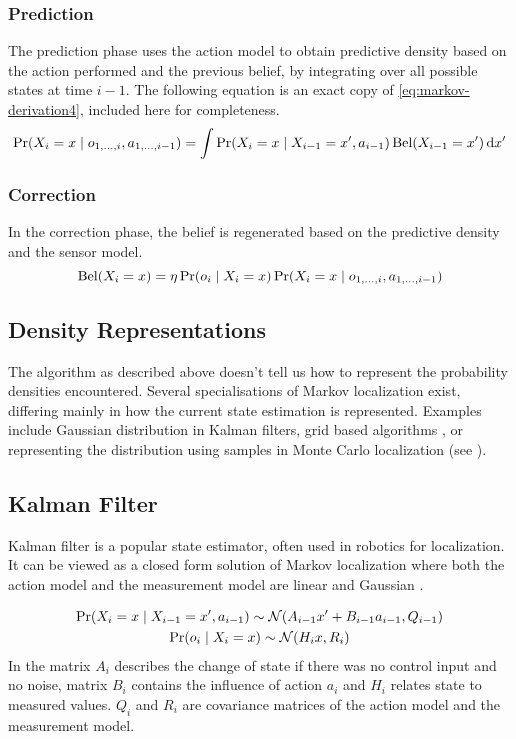 \subsubsection{Prediction}
The prediction phase uses the action model to obtain predictive density based on the action performed
and the previous belief, by integrating over all possible states at time \(i - 1\).
The following equation is an exact copy of \eqref{eq:markov-derivation4}, included here for completeness.
\begin{equation}
	\label{eq:markov-prediction}
	\operatorname{\mathrm{Pr}}(X_i = x \mid o_{1, \dotsc, i}, a_{1, \dotsc, i - 1}) =
	\int
	\operatorname{\mathrm{Pr}}(X_i = x \mid X_{i - 1}=x', a_{i - 1})
	\operatorname{\mathrm{Bel}}(X_{i-1} = x')
	\,\mathrm{d}x'
\end{equation}

\subsubsection{Correction}
In the correction phase, the belief is regenerated based on the predictive density
and the sensor model.
\begin{equation}
	\label{eq:markov-correction}
	\operatorname{\mathrm{Bel}}(X_i = x) =
	\eta \operatorname{\mathrm{Pr}}(o_i \mid X_i = x)
	\operatorname{\mathrm{Pr}}(X_i = x \mid o_{1, \dotsc, i}, a_{1, \dotsc, i - 1})
\end{equation}

\subsection{Density Representations}
The algorithm as described above doesn't tell us how to represent the probability
densities encountered.
Several specialisations of Markov localization exist, differing mainly in how the
current state estimation is represented.
Examples include Gaussian distribution in Kalman filters,
grid based algorithms \cite{fox98}, or representing the distribution
using samples in Monte Carlo localization (see ).

\subsection{Kalman Filter}
\label{sec:kalman}
Kalman filter \cite{kalman60,welch95} is a popular state estimator, often used in robotics
for localization.
It can be viewed as a closed form solution of Markov localization where both the
action model and the measurement model are linear and Gaussian \cite{diard03}.

\begin{gather}
	\label{eq:kalman-action-model}
	\operatorname{\mathrm{Pr}}(X_i = x \mid X_{i-1} = x', a_{i - 1}) \sim \operatorname{\mathcal{N}}(A_{i - 1}x' + B_{i - 1}a_{i - 1}, Q_{i - 1})
	\\
	\label{eq:kalman-measurement-model}
	\operatorname{\mathrm{Pr}}(o_{i} \mid X_i = x) \sim \operatorname{\mathcal{N}}(H_{i}x, R_i)
\end{gather}
In 
the matrix \(A_i\) describes the change of state if there was no control input and no noise,
matrix \(B_i\) contains the influence of action \(a_i\) and \(H_i\) relates state to measured
values.
\(Q_i\) and \(R_i\) are covariance matrices of the action model and the measurement model.

